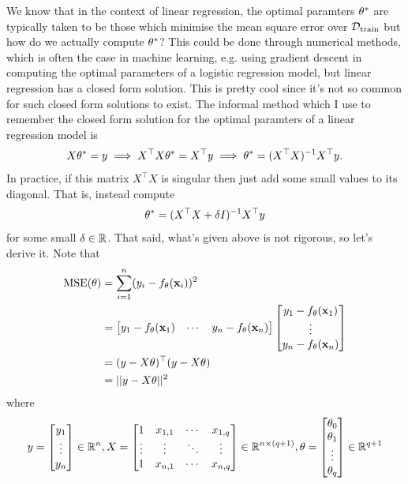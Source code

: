 \documentclass[11pt]{article}
\begin{document}
\noindent We know that in the context of linear regression, the optimal paramters $\theta^{*}$ are typically taken to be those which minimise the mean square error over $\mathcal{D}_{\text{train}}$ but how do we actually compute $\theta^{*}$? This could be done through numerical methods, which is often the case in machine learning, e.g. using gradient descent in computing the optimal parameters of a logistic regression model, but linear regression has a closed form solution. This is pretty cool since it's not so common for such closed form solutions to exist. The informal method which I use to remember the closed form solution for the optimal paramters of a linear regression model is
$$
X\theta^{*}=y \implies X^{\top}X\theta^{*}=X^{\top}y \implies \theta^{*}=(X^{\top}X)^{-1}X^{\top}y.
$$
In practice, if this matrix $X^{\top}X$ is singular then just add some small values to its diagonal. That is, instead compute
$$
\theta^{*}=(X^{\top}X+\delta I)^{-1}X^{\top}y
$$
for some small $\delta\in\mathbb{R}$. That said, what's given above is not rigorous, so let's derive it. Note that
\begin{align*}
    \text{MSE}(\theta)
    &=
    \sum_{i=1}^n(y_i-f_{\theta}(\mathbf{x}_i))^2\\
    &=
    \begin{bmatrix}
        y_1-f_{\theta}(\mathbf{x}_1) & \cdots & y_n-f_{\theta}(\mathbf{x}_n)
    \end{bmatrix}
    \begin{bmatrix}
        y_1-f_{\theta}(\mathbf{x}_1)\\
        \vdots\\
        y_n-f_{\theta}(\mathbf{x}_n)
    \end{bmatrix}\\
    &=(y-X\theta)^{\top}(y-X\theta)\\
    &=||y-X\theta||^2
\end{align*}
where
$$
y
=
\begin{bmatrix}
    y_1\\
    \vdots\\
    y_n
\end{bmatrix}
\in\mathbb{R}^n,
X
=
\begin{bmatrix}
    1 & x_{1,1} & \cdots & x_{1,q}\\
    \vdots & \vdots & \ddots & \vdots\\
    1 & x_{n,1} & \cdots & x_{n,q}
\end{bmatrix}
\in\mathbb{R}^{n\times (q+1)},
\theta
=
\begin{bmatrix}
    \theta_0\\
    \theta_1\\
    \vdots\\
    \theta_q
\end{bmatrix}
\in\mathbb{R}^{q+1}
$$
\end{document}
